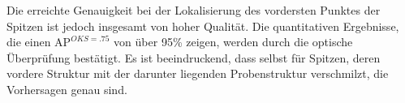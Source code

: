 Die erreichte Genauigkeit bei der Lokalisierung des vordersten Punktes der Spitzen ist jedoch insgesamt von hoher Qualität. Die quantitativen Ergebnisse, die einen $\text{AP}^{OKS=.75}$ von über 95\% zeigen, werden durch die optische Überprüfung bestätigt. Es ist beeindruckend, dass selbst für Spitzen, deren vordere Struktur mit der darunter liegenden Probenstruktur verschmilzt, die Vorhersagen genau sind.

